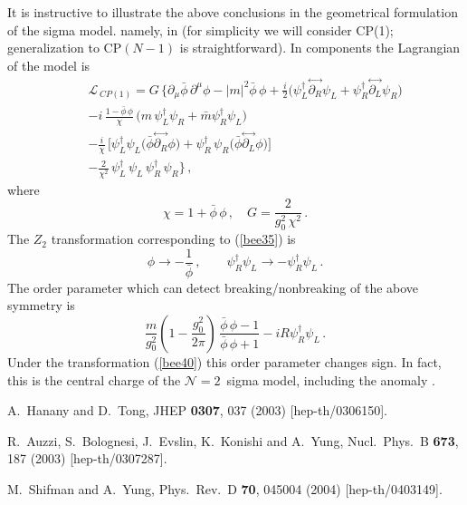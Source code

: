 \documentclass[epsfig,12pt]{article}
\def\beq{\begin{equation}}
\def\eeq{\end{equation}}
\def\beqn{\begin{eqnarray}}
\def\eeqn{\end{eqnarray}}
\newcommand{\ntwo}{${\mathcal N}=2\,$}
\def\beqn{\begin{eqnarray}}
\def\eeqn{\end{eqnarray}}
\def\beq{\begin{equation}}
\def\eeq{\end{equation}}
\begin{document}
{It is instructive to illustrate the above conclusions
in  the geometrical  formulation of the sigma model. namely, in
(for simplicity we will consider CP(1); generalization to CP$(N-1)$ is straightforward).
In components the Lagrangian of the model is
\beqn
&&
{\mathcal L}_{\,  CP(1)}= G\, \Big\{
\partial_\mu \bar{\phi}\, \partial^\mu\phi -|m|^2{\bar{\phi}\,\phi} 
+\frac{i}{2}\big(\psi_L^\dagger\!\stackrel{\leftrightarrow}{\partial_R}\!\psi_L 
+ \psi_R^\dagger\!\stackrel{\leftrightarrow}{\partial_L}\!\psi_R
\big)
\nonumber\\[1mm] 
&&
-i\,\frac{1-\bar{\phi}\,\phi}{\chi} \,\big(m\,\psi_L^\dagger \psi_R + \bar m
\psi_R^\dagger \psi_L
\big)
\nonumber\\[1mm] 
&&
-\frac{i}{\chi}\,  \big[\psi_L^\dagger \psi_L
\big(\bar{\phi} \!\stackrel{\leftrightarrow}{\partial_R}\!\phi
\big)+ \psi_R^\dagger\, \psi_R
\big(\bar{\phi}\!\stackrel{\leftrightarrow}{\partial_L}\!\phi
\big)
\big]
\nonumber\\[1mm]
&&
-
\frac{2}{\chi^2}\,\psi_L^\dagger\,\psi_L \,\psi_R^\dagger\,\psi_R
\Big\}\,,
\label{Aone}
\eeqn
where 
\beq
\chi = 1+\bar{\phi}\,\phi\,,\quad G= \frac{2}{g_0^2\,\chi^2}\,.
\eeq
The $Z_2$ transformation corresponding to (\ref{bee35}) is
\beq
\phi \to -\frac{1}{\bar{\phi}}\,,\qquad \psi_R^\dagger \psi_L\to -
\psi_R^\dagger \psi_L\,.
\label{bee40}
\eeq
 The order parameter which can detect breaking/nonbreaking of the above
symmetry is
\beq
\frac{m}{g_0^2} \left(1- \frac{g_0^2}{2\pi}
\right)\, \frac{\bar{\phi}\,\phi-1}{\bar{\phi}\,\phi+1} - 
i R \psi_R^\dagger \psi_L\,.
\eeq
Under the transformation (\ref{bee40}) this order parameter changes sign.
In fact, this is  the central charge of the \ntwo
sigma model, including the anomaly  \cite{ls,ls1}.


\newpage
{}



\small
\begin{thebibliography}{99}
\itemsep -2pt

A.~Hanany and D.~Tong,
JHEP {\bf 0307}, 037 (2003)
[hep-th/0306150].

R.~Auzzi, S.~Bolognesi, J.~Evslin, K.~Konishi and A.~Yung,
Nucl.\ Phys.\ B {\bf 673}, 187 (2003)
[hep-th/0307287].

M.~Shifman and A.~Yung,
Phys.\ Rev.\ D {\bf 70}, 045004 (2004)
[hep-th/0403149].


\end{thebibliography}}
\end{document}
